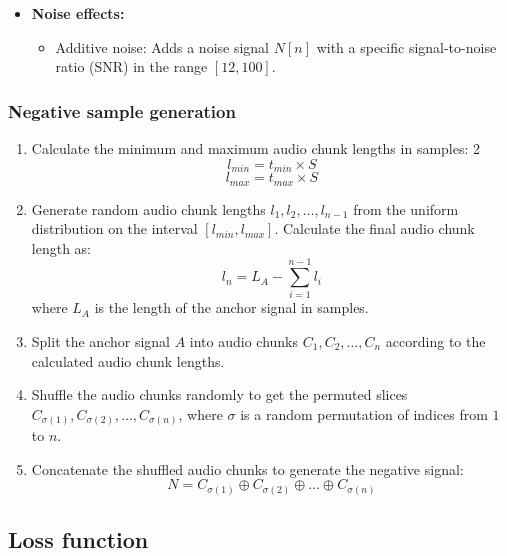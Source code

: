 \begin{itemize}
\item \textbf{Noise effects:}
\begin{itemize}
    \item Additive noise: Adds a noise signal $N[n]$ with a specific signal-to-noise ratio (SNR) in the range $[12, 100]$.
\end{itemize}
\end{itemize}

\subsubsection{Negative sample generation}

\begin{enumerate}
\item Calculate the minimum and maximum audio chunk lengths in samples:
2\begin{equation}
l_{min} = t_{min} \times S
\end{equation}
\begin{equation}
l_{max} = t_{max} \times S
\end{equation}
\item Generate random audio chunk lengths $l_1, l_2, \ldots, l_{n-1}$ from the uniform distribution on the interval $[l_{min}, l_{max}]$. Calculate the final audio chunk length as:
\begin{equation}
l_n = L_A - \sum_{i=1}^{n-1} l_i
\end{equation}
where $L_A$ is the length of the anchor signal in samples.
\item Split the anchor signal $A$ into audio chunks $C_1, C_2, \ldots, C_n$ according to the calculated audio chunk lengths.
\item Shuffle the audio chunks randomly to get the permuted slices $C_{\sigma(1)}, C_{\sigma(2)}, \ldots, C_{\sigma(n)}$, where $\sigma$ is a random permutation of indices from $1$ to $n$.
\item Concatenate the shuffled audio chunks to generate the negative signal:
\begin{equation}\label{eq:negative_signal}
N = C_{\sigma(1)} \oplus C_{\sigma(2)} \oplus \ldots \oplus C_{\sigma(n)}
\end{equation}
\end{enumerate}

\subsection{Loss function}

